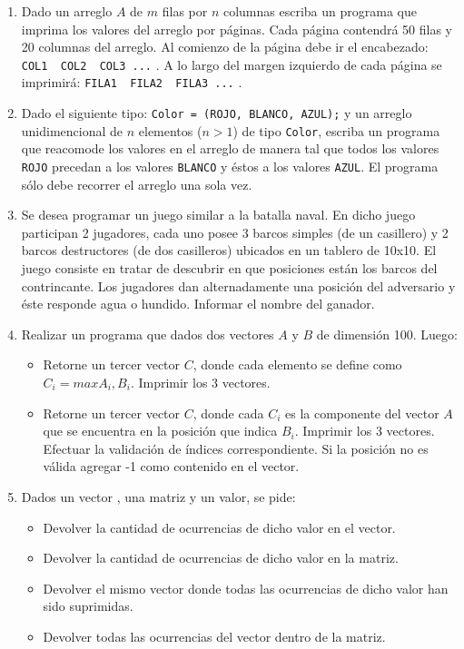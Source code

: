 \documentclass[a4paper,10pt]{article}
\begin{document}
\begin{enumerate}
\item Dado un arreglo $A$ de $m$ filas por $n$ columnas escriba un programa que imprima los valores del arreglo por p\'aginas. Cada p\'agina contendr\'a 50 filas y 20 columnas del arreglo. Al comienzo de la p\'agina debe ir el encabezado: \verb=COL1  COL2  COL3 ...= . A lo largo del margen izquierdo de cada p\'agina se imprimir\'a: \verb=FILA1  FILA2  FILA3 ...= .

\item Dado el siguiente tipo: \verb+Color = (ROJO, BLANCO, AZUL);+ y un arreglo unidimencional de $n$ elementos ($n>1$) de tipo \verb=Color=, escriba un programa que reacomode los valores en el arreglo de manera tal que todos los valores \verb=ROJO= precedan a los valores \verb=BLANCO= y \'estos a los valores \verb=AZUL=. El programa s\'olo debe recorrer el arreglo una sola vez.

\item Se desea programar un juego similar a la batalla naval. En dicho juego participan 2 jugadores, cada uno posee 3 barcos simples (de un casillero) y 2 barcos destructores (de dos casilleros) ubicados en un tablero de 10x10. El juego consiste en tratar de descubrir en que posiciones est\'an los barcos del contrincante. Los jugadores dan alternadamente una posici\'on del adversario y \'este responde agua o hundido. Informar el nombre del ganador.

\item Realizar un programa que dados dos vectores $A$ y $B$ de dimensi\'on 100. Luego:
    \begin{itemize}
        \item[a-] Retorne un tercer vector $C$, donde cada elemento se define como $C_i = max { A_i, B_i }$. Imprimir los 3 vectores.
        \item[b-] Retorne un tercer vector $C$, donde cada $C_i$ es la componente del vector $A$ que se encuentra en la posici\'on que indica $B_i$. Imprimir los 3 vectores. Efectuar la validaci\'on de \'indices correspondiente. Si la posici\'on no es v\'alida agregar -1 como contenido en el vector.
    \end{itemize}
    
\item Dados un vector , una matriz y un valor, se pide:
    \begin{itemize}
        \item[a-] Devolver la cantidad de ocurrencias de dicho valor en el vector.
        \item[b-] Devolver la cantidad de ocurrencias de dicho valor en la matriz.
        \item[c-] Devolver el mismo vector donde todas las ocurrencias de dicho valor han sido suprimidas.
        \item[c-] Devolver todas las ocurrencias del vector dentro de la matriz.
    \end{itemize}


\end{enumerate}
\end{document}

